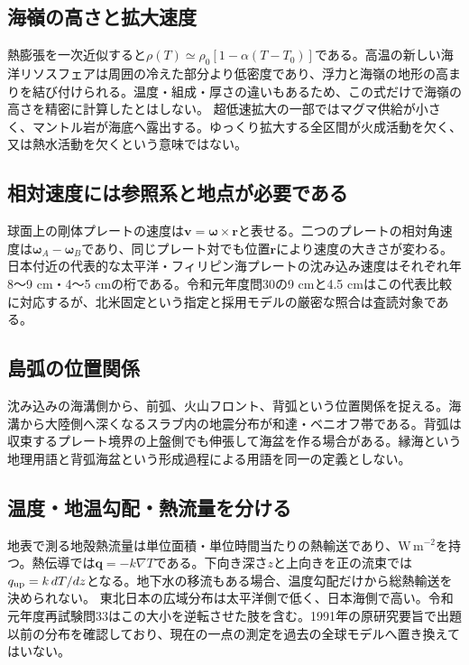 \subsection{海嶺の高さと拡大速度}
\label{theory:interior:ridge}
熱膨張を一次近似すると\(\rho(T)\simeq\rho_0[1-\alpha(T-T_0)]\)である。高温の新しい海洋リソスフェアは周囲の冷えた部分より低密度であり、浮力と海嶺の地形の高まりを結び付けられる。温度・組成・厚さの違いもあるため、この式だけで海嶺の高さを精密に計算したとはしない。
超低速拡大の一部ではマグマ供給が小さく、マントル岩が海底へ露出する。ゆっくり拡大する全区間が火成活動を欠く、又は熱水活動を欠くという意味ではない。\cite{noaa_ultraslow2004}

\subsection{相対速度には参照系と地点が必要である}
\label{theory:interior:velocity}
球面上の剛体プレートの速度は\(\boldsymbol v=\boldsymbol\omega\times\boldsymbol r\)と表せる。二つのプレートの相対角速度は\(\boldsymbol\omega_A-\boldsymbol\omega_B\)であり、同じプレート対でも位置\(\boldsymbol r\)により速度の大きさが変わる。日本付近の代表的な太平洋・フィリピン海プレートの沈み込み速度はそれぞれ年8〜9 cm・4〜5 cmの桁である。令和元年度問30の9 cmと4.5 cmはこの代表比較に対応するが、北米固定という指定と採用モデルの厳密な照合は査読対象である。\cite{kagoshima_plate2019}

\subsection{島弧の位置関係}
\label{theory:interior:arc}
沈み込みの海溝側から、前弧、火山フロント、背弧という位置関係を捉える。海溝から大陸側へ深くなるスラブ内の地震分布が和達・ベニオフ帯である。背弧は収束するプレート境界の上盤側でも伸張して海盆を作る場合がある。縁海という地理用語と背弧海盆という形成過程による用語を同一の定義としない。\cite{usgs_plate_boundaries}

\subsection{温度・地温勾配・熱流量を分ける}
\label{theory:interior:heat}
地表で測る地殻熱流量は単位面積・単位時間当たりの熱輸送であり、\(\mathrm{W\,m^{-2}}\)を持つ。熱伝導では\(\boldsymbol q=-k\nabla T\)である。下向き深さ\(z\)と上向きを正の流束では\(q_{\rm up}=k\,dT/dz\)となる。地下水の移流もある場合、温度勾配だけから総熱輸送を決められない。
東北日本の広域分布は太平洋側で低く、日本海側で高い。令和元年度再試験問33はこの大小を逆転させた肢を含む。1991年の原研究要旨で出題以前の分布を確認しており、現在の一点の測定を過去の全球モデルへ置き換えてはいない。\cite{gsj_heat_flow1991}

